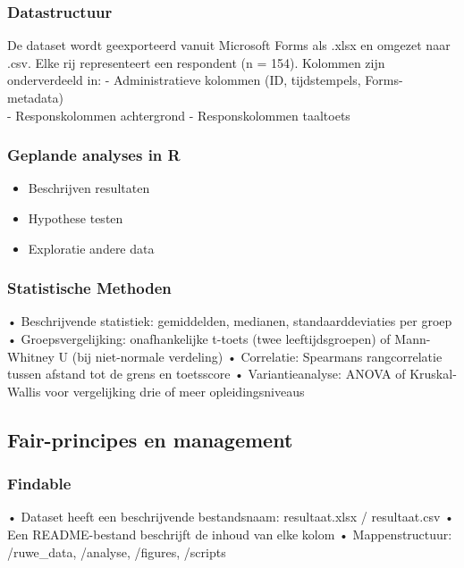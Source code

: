 \documentclass[
]{article}
\providecommand{\tightlist}{%
  \setlength{\itemsep}{0pt}\setlength{\parskip}{0pt}}
\begin{document}
\subsubsection{Datastructuur}\label{datastructuur}

De dataset wordt geexporteerd vanuit Microsoft Forms als .xlsx en
omgezet naar .csv. Elke rij representeert een respondent (n = 154).
Kolommen zijn onderverdeeld in: - Administratieve kolommen (ID,
tijdstempels, Forms-metadata)\\
- Responskolommen achtergrond - Responskolommen taaltoets

\subsubsection{Geplande analyses in R}\label{geplande-analyses-in-r}

\begin{itemize}
\tightlist
\item
  Beschrijven resultaten
\item
  Hypothese testen
\item
  Exploratie andere data
\end{itemize}

\subsubsection{Statistische Methoden}\label{statistische-methoden}

• Beschrijvende statistiek: gemiddelden, medianen, standaarddeviaties
per groep • Groepsvergelijking: onafhankelijke t-toets (twee
leeftijdsgroepen) of Mann-Whitney U (bij niet-normale verdeling) •
Correlatie: Spearmans rangcorrelatie tussen afstand tot de grens en
toetsscore • Variantieanalyse: ANOVA of Kruskal-Wallis voor vergelijking
drie of meer opleidingsniveaus

\subsection{Fair-principes en
management}\label{fair-principes-en-management}

\subsubsection{Findable}\label{findable}

• Dataset heeft een beschrijvende bestandsnaam: resultaat.xlsx /
resultaat.csv • Een README-bestand beschrijft de inhoud van elke kolom •
Mappenstructuur: /ruwe\_data, /analyse, /figures, /scripts
\end{document}
